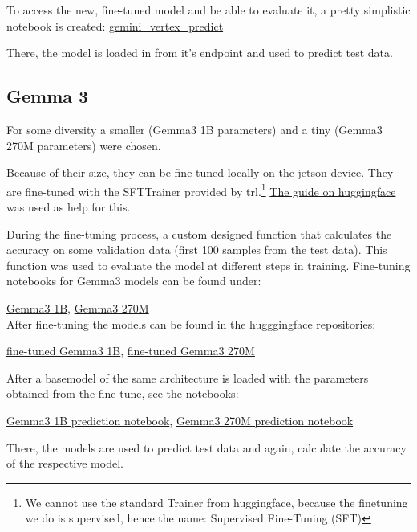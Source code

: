 \documentclass{article}
\begin{document}
To access the new, fine-tuned model and be able to evaluate it, a pretty 
simplistic notebook is created: \href{https://github.com/AntonStantan/matura/blob/main/pre-trained-tranformers/gemini_vertex_predict.ipynb}
{gemini\_vertex\_predict}

There, the model is loaded in from it's endpoint and used to predict test 
data. 

\subsection{Gemma 3}
For some diversity a smaller (Gemma3 1B parameters) and a tiny (Gemma3 270M 
parameters) were chosen.

Because of their size, they can be fine-tuned locally on the jetson-device.
They are fine-tuned with the SFTTrainer provided by trl.\footnote{We cannot 
use the standard Trainer from huggingface, because the finetuning we do is 
supervised, hence the name: Supervised Fine-Tuning (SFT)} \href{https://huggingface.co/docs/trl/en/sft_trainer}
{The guide on huggingface} was used as help for this.

During the fine-tuning process, a custom designed function that calculates 
the accuracy on some validation data (first 100 samples from the test data). 
This function was used to evaluate the model at different steps in training. 
Fine-tuning notebooks for Gemma3 models can be found under:

\href{https://github.com/AntonStantan/matura/blob/main/pre-trained-tranformers/big_gemma_huggingface.ipynb}{Gemma3 1B}, \href{https://github.com/AntonStantan/matura/blob/main/pre-trained-tranformers/gemma_huggingface.ipynb}{Gemma3 270M}
\\[2em]
After fine-tuning the models can be found in the hugggingface repositories:

\href{https://huggingface.co/AntonBOOM/big_output}{fine-tuned Gemma3 1B}, 
\href{https://huggingface.co/AntonBOOM/output1}{fine-tuned Gemma3 270M}

After a basemodel of the same architecture is loaded with the parameters 
obtained from the fine-tune, see the notebooks: 

\href{https://github.com/AntonStantan/matura/blob/main/pre-trained-tranformers/big_gemma_huggingface_predict.ipynb}{Gemma3 1B prediction notebook}, 
\href{https://github.com/AntonStantan/matura/blob/main/pre-trained-tranformers/gemma-huggingface-predict.ipynb}{Gemma3 270M prediction notebook}

There, the models are used to predict test data and again, calculate the 
accuracy of the respective model.
\end{document}
